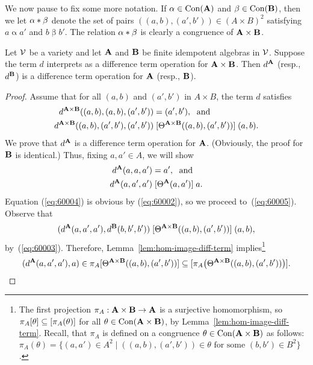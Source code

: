 We now pause to fix some more notation.
If $\alpha \in \operatorname{Con}(\mathbf{A})$ and $\beta \in \operatorname{Con}(\mathbf{B})$, then we let
$\alpha \ast \beta$ denote the set of pairs $((a,b),(a',b'))\in (A\times B)^2$ satisfying
$a \mathrel{\alpha} a'$ and $b \mathrel{\beta} b'$.  The relation
$\alpha \ast \beta$ is clearly a congruence of $\mathbf{A} \times \mathbf{B}$.

\begin{lem}
  \label{lem:products}
  Let $\mathcal{V}$ be a variety and let $\mathbf{A}$ and $\mathbf{B}$ be finite idempotent
  algebras in $\mathcal{V}$. Suppose the term $d$
  interprets as a difference term operation for $\mathbf{A}\times \mathbf{B}$.
  Then $d^{\mathbf{A}}$ (resp., $d^{\mathbf{B}}$) is a difference term operation for
  $\mathbf{A}$  (resp., $\mathbf{B}$).
\end{lem}
\begin{proof}
  Assume that for all $(a, b)$ and $(a', b')$ in $A \times B$, the term $d$ satisfies
  \begin{align}
    d^{\mathbf{A} \times \mathbf{B}}((a, b), (a, b), (a', b')) &= (a', b'),\; \text{ and } \label{eq:60002}\\
    d^{\mathbf{A} \times \mathbf{B}}((a, b), (a', b'), (a', b'))
    &\mathrel{[\Theta^{\mathbf{A} \times \mathbf{B}}((a, b), (a', b'))]} (a, b). \label{eq:60003}
  \end{align}
  We prove that $d^{\mathbf{A}}$ is a difference term operation
  for $\mathbf{A}$. (Obviously, the proof for $\mathbf{B}$ is identical.)
  Thus, fixing $a, a' \in A$, we will show
  \begin{align}
    d^{\mathbf{A}}(a, a, a') &= a',\; \text{ and } \label{eq:60004}\\
    d^{\mathbf{A}}(a,a',a')
    &\mathrel{[\Theta^{\mathbf{A}}(a, a')]} a. \label{eq:60005}
  \end{align}
  Equation (\ref{eq:60004}) is obvious by (\ref{eq:60002}),
  so we proceed to~(\ref{eq:60005}).
  Observe that
  \[
  (d^{\mathbf{A}}(a, a',a'), d^{\mathbf{B}}(b, b',b'))
  \mathrel{[\Theta^{\mathbf{A} \times \mathbf{B}}((a, b), (a', b'))]} (a, b),
  \]
  by~(\ref{eq:60003}). Therefore, Lemma~\ref{lem:hom-image-diff-term}
  implies\footnote{The first projection
    $\pi_A : \mathbf{A} \times \mathbf{B} \to \mathbf{A}$ is a surjective
    homomorphism, so
  $\pi_A [\theta] \subseteq [\pi_A(\theta)]$
    for all $\theta \in \operatorname{Con} (\mathbf{A} \times \mathbf{B})$,
    by Lemma~\ref{lem:hom-image-diff-term}. Recall, that
    $\pi_A$ is defined on a congruence $\theta \in \operatorname{Con}(\mathbf{A} \times \mathbf{B})$ as follows:
    $\pi_A(\theta) = \{(a,a') \in A^2 \mid ((a,b),(a',b')) \in \theta \text{ for
      some $(b,b')\in B^2$}\}$.}
  \[
    (d^{\mathbf{A}}(a, a',a'), a)\in \pi_A [\Theta^{\mathbf{A} \times \mathbf{B}}((a, b), (a', b'))]
    \subseteq [\pi_A\bigl(\Theta^{\mathbf{A} \times \mathbf{B}}((a, b), (a', b'))\bigr)].
\]
\end{proof}
